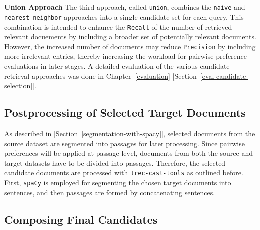 \\\\
\textbf{Union Approach} The third approach, called \texttt{union}, combines the \texttt{naive} and \texttt{nearest neighbor} approaches into a single candidate set for each query. This combination is intended to enhance the \texttt{Recall} of the number of retrieved relevant docuements by including a broader set of potentially relevant documents. However, the increased number of documents may reduce \texttt{Precision} by including more irrelevant entries, thereby increasing the workload for pairwise preference evaluations in later stages. A detailed evaluation of the various candidate retrieval approaches was done in Chapter~\ref{evaluation} [Section~\ref{eval-candidate-selection}].

\subsection{Postprocessing of Selected Target Documents}\label{postprocessing-of-selected-target-documents}

As described in [Section~\ref{segmentation-with-spacy}], selected documents from the source dataset are segmented into passages for later processing. Since pairwise preferences will be applied at passage level, documents from both the source and target datasets have to be divided into passages. Therefore, the selected candidate documents are processed with \texttt{trec-cast-tools} as outlined before. First, \texttt{spaCy} is employed for segmenting the chosen target documents into sentences, and then passages are formed by concatenating sentences.

\subsection{Composing Final Candidates}\label{composing-final-candidates}

